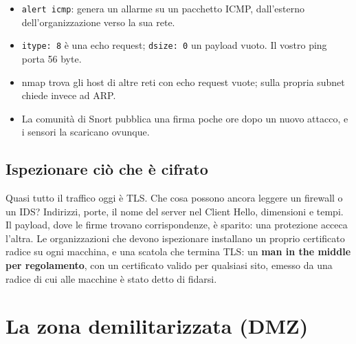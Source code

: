 \begin{itemize}
    \item \texttt{alert icmp}: genera un allarme su un pacchetto ICMP, dall'esterno dell'organizzazione verso la sua rete.
    \item \texttt{itype: 8} è una echo request; \texttt{dsize: 0} un payload vuoto. Il vostro ping porta 56 byte.
    \item nmap trova gli host di altre reti con echo request vuote; sulla propria subnet chiede invece ad ARP.
    \item La comunità di Snort pubblica una firma poche ore dopo un nuovo attacco, e i sensori la scaricano ovunque.
\end{itemize}


\subsection{Ispezionare ciò che è cifrato}

Quasi tutto il traffico oggi è TLS. Che cosa possono ancora leggere un firewall o un IDS? Indirizzi, porte, il nome del server nel Client
Hello, dimensioni e tempi. Il payload, dove le firme trovano corrispondenze, è sparito: una protezione acceca l'altra. Le organizzazioni che
devono ispezionare installano un proprio certificato radice su ogni macchina, e una scatola che termina TLS: un \textbf{man in the middle
per regolamento}, con un certificato valido per qualsiasi sito, emesso da una radice di cui alle macchine è stato detto di fidarsi.

\section{La zona demilitarizzata (DMZ)}

